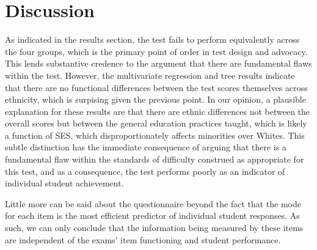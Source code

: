 \documentclass{article}\usepackage[]{graphicx}\usepackage[]{color}
\begin{document}
\section{Discussion}
As indicated in the results section, the test fails to perform equivalently across the four groups, which is the primary point of order in test design and advocacy. This lends substantive credence to the argument that there are fundamental flaws within the test. However, the multivariate regression and tree results indicate that there are no functional differences between the test scores themselves across ethnicity, which is surpising given the previous point. In our opinion, a plausible explanation for these results are that there are ethnic differences not between the overall scores but between the general education practices taught, which is likely a function of SES, which disproportionately affects minorities over Whites. This subtle distinction has the immediate consequence of arguing that there is a fundamental flaw within the standards of difficulty construed as appropriate for this test, and as a consequence, the test performs poorly as an indicator of individual student achievement.

Little more can be said about the questionnaire beyond the fact that the mode for each item is the most efficient predictor of individual student responses. As such, we can only conclude that the information being measured by these items are independent of the exams' item functioning and student performance.


{}

\end{document}
